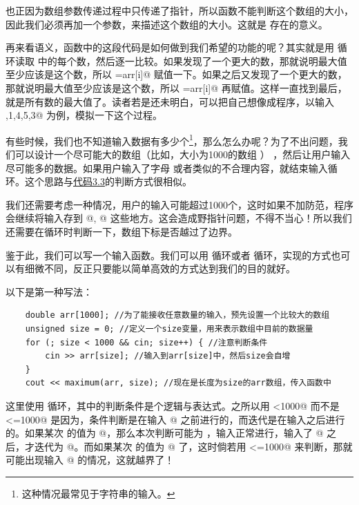 也正因为数组参数传递过程中只传递了指针，所以函数不能判断这个数组的大小，因此我们必须再加一个参数，来描述这个数组的大小。这就是 \lstinline@n@ 存在的意义。\par
再来看语义，\lstinline@maximum@ 函数中的这段代码是如何做到我们希望的功能的呢？其实就是用 \lstinline@for@ 循环读取 \lstinline@arr@ 中的每个数，然后逐一比较。如果发现了一个更大的数，那就说明最大值至少应该是这个数，所以 \lstinline@ref=arr[i]@ 赋值一下。如果之后又发现了一个更大的数，那就说明最大值至少应该是这个数，所以 \lstinline@ref=arr[i]@ 再赋值。这样一直找到最后，\lstinline@res@ 就是所有数的最大值了。读者若是还未明白，可以把自己想像成程序，以输入 ,1,4,5,3@ 为例，模拟一下这个过程。\par
有些时候，我们也不知道输入数据有多少个\footnote{这种情况最常见于字符串的输入。}，那么怎么办呢？为了不出问题，我们可以设计一个尽可能大的数组（比如，大小为1000的数组 \lstinline@arr@） ，然后让用户输入尽可能多的数据。如果用户输入了字母 \lstinline@q@ 或者类似的不合理内容，就结束输入循环。这个思路与\hyperref[lst:OddOrEvenWithWhileLoop]{代码3.3}的判断方式很相似。\par
我们还需要考虑一种情况，用户的输入可能超过1000个，这时如果不加防范，程序会继续将输入存到 \lstinline@arr[1000]@, \lstinline@arr[1001]@ 这些地方。这会造成野指针问题，不得不当心！所以我们还需要在循环时判断一下，数组下标是否越过了边界。\par
鉴于此，我们可以写一个输入函数。我们可以用 \lstinline@for@ 循环或者 \lstinline@while@ 循环，实现的方式也可以有细微不同，反正只要能以简单高效的方式达到我们的目的就好。\par
以下是第一种写法：
\begin{lstlisting}
    double arr[1000]; //为了能接收任意数量的输入，预先设置一个比较大的数组
    unsigned size = 0; //定义一个size变量，用来表示数组中目前的数据量
    for (; size < 1000 && cin; size++) { //注意判断条件
        cin >> arr[size]; //输入到arr[size]中，然后size会自增
    }
    cout << maximum(arr, size); //现在是长度为size的arr数组，传入函数中
\end{lstlisting}
这里使用 \lstinline@for@ 循环，其中的判断条件是个逻辑与表达式。之所以用 \lstinline@size<1000@ 而不是 \lstinline@size<=1000@ 是因为，条件判断是在输入 \lstinline@arr[size]@ 之前进行的，而迭代是在输入之后进行的。如果某次 \lstinline@size@ 的值为 @，那么本次判断可能为 \lstinline@true@，输入正常进行，输入了 \lstinline@arr[999]@ 之后，\lstinline@size@ 才迭代为 @。而如果某次 \lstinline@size@ 的值为 @ 了，这时倘若用 \lstinline@size<=1000@ 来判断，那就可能出现输入 \lstinline@arr[1000]@ 的情况，这就越界了！\par
